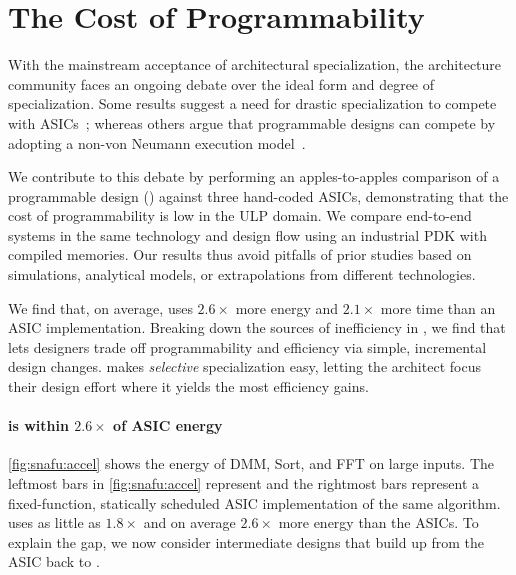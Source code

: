 \figSNAFUAccel
\section{The Cost of Programmability}
\label{snafu:case}
%
With the mainstream acceptance of architectural specialization,
the architecture community faces an ongoing debate over the ideal form and degree of specialization.
%
Some results suggest a need for drastic specialization to compete
with ASICs~\cite{hameed2010understanding,taylor2012dark,shao2014aladdin};
%
whereas others argue that programmable designs can compete by
adopting a non-von Neumann execution
model~\cite{nowatzki2016dsa,nowatzki2017domain}.

We contribute to this debate by performing an apples-to-apples
comparison of a programmable design (\snafuarch) against three hand-coded ASICs,
%
demonstrating that the cost of programmability is low in the ULP domain.
%
We compare end-to-end systems in the same technology and design flow
using an industrial PDK with compiled memories.
%
Our results thus avoid pitfalls of prior studies based on simulations,
analytical models, or extrapolations from different
technologies.

We find that, on average, \snafuarch uses $2.6\times$ more energy
and $2.1\times$ more time than an ASIC implementation.
%
Breaking down the sources of inefficiency in \snafuarch,
%
we find that \snafu lets designers trade off programmability and efficiency
via simple, incremental design changes.
%
\snafu makes {\em selective} specialization easy, letting the architect
focus their design effort where it yields the most efficiency gains.

\paragraph{\snafu is within $2.6\times$ of ASIC energy}
\autoref{fig:snafu:accel} shows the energy of DMM, Sort, and FFT on large inputs.
%
The leftmost bars in \autoref{fig:snafu:accel} represent \snafuarch and the rightmost bars %
represent a fixed-function, statically scheduled ASIC implementation of the same algorithm.
% 
\snafuarch uses as little as $1.8\times$ and on average $2.6\times$ more energy than the ASICs.
%
To explain the gap,
we now consider intermediate designs that build up from the ASIC back to \snafuarch.

